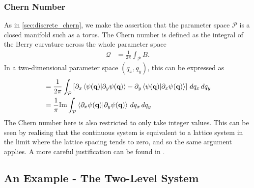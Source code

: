 \subsubsection{Chern Number}

As in \textsection\ref{sec:discrete_chern}, we make the assertion that the parameter space $\mathcal P$ is a closed manifold such as a torus. The Chern number is defined as the integral of the Berry curvature across the whole parameter space
\begin{align}
    \mathcal Q &= \frac{1}{2\pi} \int_{\mathcal{P}} B.
\end{align}
In a two-dimensional parameter space $(q_x,q_y)$, this can be expressed as
\begin{align}
     &= \frac{1}{2\pi} \int_{\mathcal{P}}\left [ \partial_x \braket{\psi(\textbf{q}) | \partial_y \psi(\textbf{q})} - \partial_y \braket{\psi(\textbf{q}) | \partial_x \psi(\textbf{q})}\right ] \, dq_x\, dq_y\\
     &= \frac{1}{\pi} \textup{Im}  \int_{\mathcal{P}} \braket{\partial_x \psi(\textbf{q}) | \partial_y \psi(\textbf{q})}\, dq_x\, dq_y
\end{align}
The Chern number here is also restricted to only take integer values. This can be seen by realising that the continuous system is equivalent to a lattice system in the limit where the lattice spacing tends to zero, and so the same argument applies. A more careful justification can be found in \cite{vanderbilt_berry_2018}.

\subsection{An Example - The Two-Level System} \label{sec:an_example}

